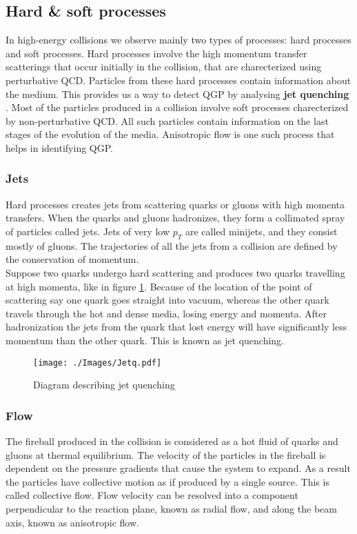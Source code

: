 \documentclass[12pt,a4paper,twoside]{report}
\begin{document}
\subsection{Hard \& soft processes}
In high-energy collisions we observe mainly two types of processes: hard processes and soft processes. Hard processes involve the high momentum transfer scatterings that occur initially in the collision, that are charecterized using perturbative QCD. Particles from these hard processes contain information about the medium. This provides us a way to detect QGP by analysing \textbf{jet quenching} \cite{Ref:jetQ-paper3}. Most of the particles produced in a collision involve soft processes charecterized by non-perturbative QCD. All such particles contain information on the last stages of the evolution of the media. Anisotropic flow is one such process that helps in identifying QGP.
\subsubsection{Jets}
Hard processes creates jets from scattering quarks or gluons with high momenta transfers. When the quarks and gluons hadronizes, they form a collimated spray of particles called jets. Jets of very low $p_T$ are called minijets, and they consist mostly of gluons. The trajectories of all the jets from a collision are defined by the conservation of momentum.\\
Suppose two quarks undergo hard scattering and produces two quarks travelling at high momenta, like in figure \ref{fig:JetQ}. Because of the location of the point of scattering say one quark goes straight into vacuum, whereas the other quark travels through the hot and dense media, losing energy and momenta. After hadronization the jets from the quark that lost energy will have significantly less momentum than the other quark. This is known as jet quenching.
\begin{figure}[H]
	\texttt{[image: ./Images/Jetq.pdf]}
	\caption{\label{fig:JetQ}Diagram describing jet quenching}
\end{figure}
\subsubsection{Flow}
The fireball produced in the collision is considered as a hot fluid of quarks and gluons at thermal equilibrium. The velocity of the particles in the fireball is dependent on the pressure gradients that cause the system to expand. As a result the particles have collective motion as if produced by a single source. This is called collective flow. Flow velocity can be resolved into a component perpendicular to the reaction plane, known as radial flow, and along the beam axis, known as anisotropic flow.
\end{document}
